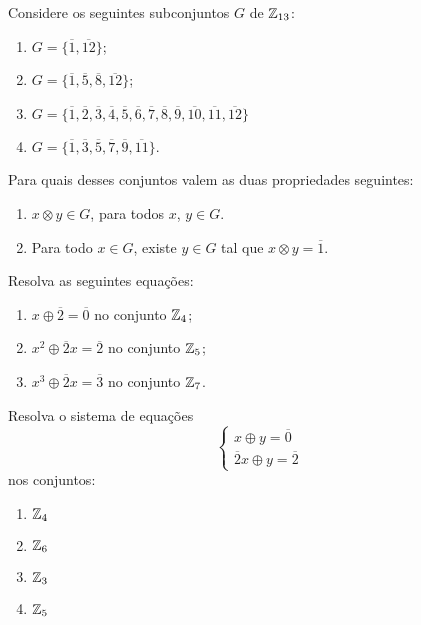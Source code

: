 \documentclass[12pt]{exam}
\begin{document}
    \questao{} Considere os seguintes subconjuntos $G$ de $\mathbb{Z}_{13}$:
    \begin{multicols}{2}
        \begin{enumerate}[label=({\alph*})]
          \item $G=\{\overline{1},\overline{12}\}$;

          \item $G=\{\overline{1},\overline{5},\overline{8},\overline{12}\}$;

          \item $G=\{\overline{1},\overline{2},\overline{3},\overline{4}, \overline{5},\overline{6},\overline{7},
           \overline{8},\overline{9},\overline{10},\overline{11},\overline{12}\}$
      
         \item $G=\{\overline{1}, \overline{3},\overline{5},\overline{7},\overline{9},\overline{11}\}$.
      \end{enumerate}
    \end{multicols}

    Para quais desses conjuntos valem as duas propriedades seguintes:
    \begin{enumerate}[label=({\roman*})]
      \item $x \otimes y \in G$, para todos $x$, $y \in G$.
      \item Para todo $x \in G$, existe $y \in G$ tal que $x \otimes y = \overline{1}$.
    \end{enumerate}

    \vspace{.3cm}

    \questao{} Resolva as seguintes equa\c{c}\~oes:
    \begin{enumerate}[label={\alph*})]
      \item $x \oplus \overline{2} = \overline{0}$ no conjunto $\mathbb{Z}_4$;
      \item $x^2 \oplus \overline{2}x = \overline{2}$ no conjunto $\mathbb{Z}_5$;
      \item $x^3 \oplus \overline{2}x = \overline{3}$ no conjunto $\mathbb{Z}_7$.
    \end{enumerate}

    \vspace{.3cm}

    \questao{} Resolva o sistema de equa\c{c}\~oes
    \[
      \begin{cases}
        x \oplus y = \overline{0}\\
        \overline{2}x \oplus y = \overline{2}
      \end{cases}
    \]
    nos conjuntos:
    \begin{multicols}{2}
      \begin{enumerate}[label=({\alph*})]
          \item $\mathbb{Z}_4$
          \item $\mathbb{Z}_6$
          \item $\mathbb{Z}_3$
          \item $\mathbb{Z}_5$
      \end{enumerate}
    \end{multicols}
\end{document}
